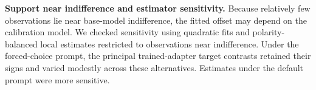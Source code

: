 \documentclass{article}
\begin{document}
\textbf{Support near indifference and estimator sensitivity.} Because relatively few observations lie near base-model indifference, the fitted offset may depend on the calibration model. We checked sensitivity using quadratic fits and polarity-balanced local estimates restricted to observations near indifference. Under the forced-choice prompt, the principal trained-adapter target contrasts retained their signs and varied modestly across these alternatives. Estimates under the default prompt were more sensitive.


\end{document}
